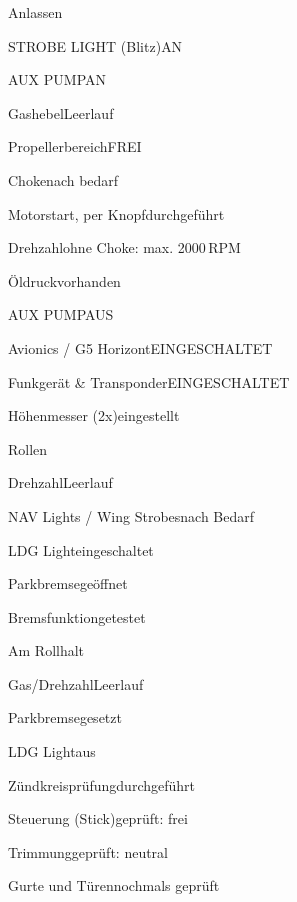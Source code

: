 \begin{checklist}{Anlassen}
	\item{STROBE LIGHT (Blitz)}{AN}
	\item{AUX PUMP}{AN}
	\item{Gashebel}{Leerlauf}
	\item{Propellerbereich}{FREI}
	\item{Choke}{nach bedarf}
	\item{Motorstart, per Knopf}{durchgeführt}
	\item{Drehzahl}{ohne Choke: max. 2000\,RPM}
	\item{Öldruck}{vorhanden}
	\item{AUX PUMP}{AUS}
	\item{Avionics / G5 Horizont}{EINGESCHALTET}
	\item{Funkgerät \& Transponder}{EINGESCHALTET}
	\item{Höhenmesser (2x)}{eingestellt}
\end{checklist}

\begin{checklist}{Rollen}
	\item{Drehzahl}{Leerlauf}
	\item{NAV Lights / Wing Strobes}{nach Bedarf}
	\item{LDG Light}{eingeschaltet}
	\item{Parkbremse}{geöffnet}
	  \item{Bremsfunktion}{getestet}
\end{checklist}

\begin{checklist}{Am Rollhalt}
	\item{Gas/Drehzahl}{Leerlauf}
	\item{Parkbremse}{gesetzt}
	\item{LDG Light}{aus}
	\item{Zündkreisprüfung}{durchgeführt}
	\item{Steuerung (Stick)}{geprüft: frei}
	\item{Trimmung}{geprüft: neutral}
	\item{Gurte und Türen}{nochmals geprüft}
\end{checklist}

